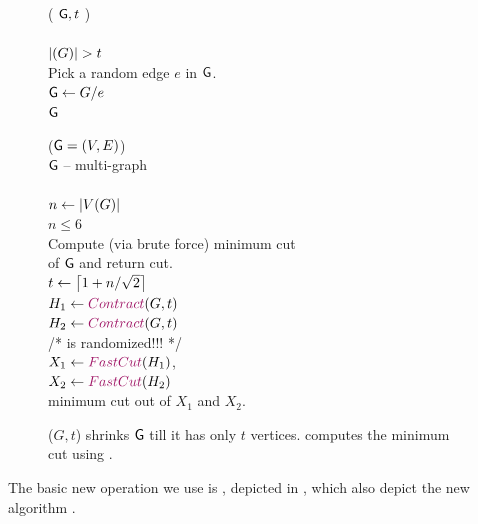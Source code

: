 \begin{figure}
    \hfill
    \begin{algorithmEnv}
        \!\!\Contract( $\mathsf{G}, t$ )\\
        \Procbegin{}  \+  \\
        \While{} $\cardin{(G)}>t$ \Do\+\\
        Pick a random edge $e$ in $\mathsf{G}$.\\
        $\mathsf{G}\leftarrow G/e$\-\\
        \Return{} $\mathsf{G}$\- \\
        \End{}
    \end{algorithmEnv}
    \hfill
    \begin{algorithmEnv}
        \noindent%
        \!\!\FastCut{}($\mathsf{G}=(V,E)$) \+\\
        $\mathsf{G}$ -- multi-graph \- \\
        \Procbegin{}\+\\
        $n\leftarrow\left| {V(G)} \right|$\\
        \If{} $n\leq 6$ \Then\+ \\
        Compute (via brute force) minimum cut\\
        of $\mathsf{G}$ and return
        cut.\-\\
        $t\leftarrow \left\lceil { 1+ n/\sqrt{2}} \right\rceil$\\
        $H_{1} \leftarrow \Contract{}(G,t)$\\
        $H_{2} \leftarrow \Contract{}(G,t)$\\
        /* \Contract{} is randomized!!! {*}/\\
        $X_{1}\leftarrow \FastCut{}\pth{H_{1}}$,\\
        $X_{2}\leftarrow \FastCut{}\pth{H_{2}}$\\
        \Return minimum cut out of $X_{1}$ and
        $X_{2}$.\- \\
        \End{}
    \end{algorithmEnv}
    \hfill
    
    \caption{\Contract{}($ G, t$) shrinks $\mathsf{G}$ till it has only
       $t$ vertices. \FastCut{} computes the minimum cut using
       \Contract{}.}
\end{figure}

The basic new operation we use is \Contract{}, depicted in
, which also depict the new algorithm \FastCut{}.


